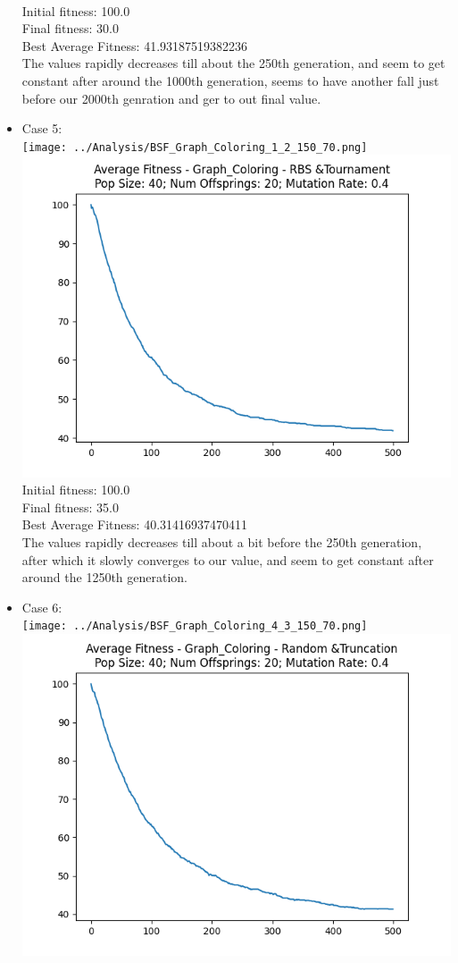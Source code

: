 \documentclass[12pt]{report} %
\begin{document}
\begin{itemize}
	      \\Initial fitness:  100.0
	      \\Final fitness:  30.0
	      \\Best Average Fitness: 41.93187519382236
	      \\The values rapidly decreases till about the 250th generation, and seem to get constant after around the 1000th generation, seems to have another fall just before our 2000th genration and ger to out final value.
	\item Case 5:\\
	      \texttt{[image: ../Analysis/BSF\_Graph\_Coloring\_1\_2\_150\_70.png]}
	      \includegraphics[scale=0.5]{../Analysis/ASF_Graph_Coloring_1_2_40_20.png}
	      \\Initial fitness:  100.0
	      \\Final fitness:  35.0
	      \\Best Average Fitness: 40.31416937470411
	      \\The values rapidly decreases till about a bit before the 250th generation, after which it slowly converges to our value, and seem to get constant after around the 1250th generation.
	\item Case 6:\\
	      \texttt{[image: ../Analysis/BSF\_Graph\_Coloring\_4\_3\_150\_70.png]}
	      \includegraphics[scale=0.5]{../Analysis/ASF_Graph_Coloring_4_3_40_20.png}

\end{itemize}
\end{document}
